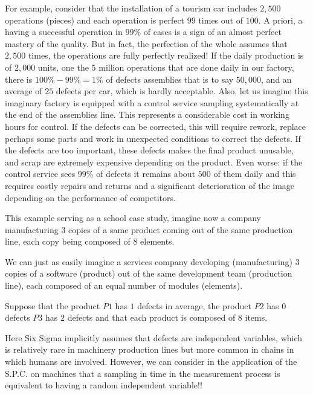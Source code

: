 For example, consider that the installation of a tourism car includes $2,500$ operations (pieces) and each operation is perfect $99$ times out of $100$. A priori, a having a successful operation in $99\%$ of cases is a sign of an almost perfect mastery of the quality. But in fact, the perfection of the whole assumes that $2,500$ times, the operations are fully perfectly realized! If the daily production is of $2,000$ units, one the $5$ million operations that are done daily in our factory, there is $100\%-99\%=1\%$ of defects assemblies that is to say $50,000$, and an average of $25$ defects per car, which is hardly acceptable. Also, let us imagine  this imaginary factory is equipped with a control service sampling systematically at the end of the assemblies line. This represents a considerable cost in working hours for control. If the defects can be corrected, this will require rework, replace perhaps some parts and work in unexpected conditions to correct the defects. If the defects are too important, these defects makes the final product unusable, and scrap are extremely expensive depending on the product. Even worse: if the control service sees $99\%$ of defects it remains about $500$  of them daily and this requires costly repairs and returns and a significant deterioration of the image depending on the performance of competitors.

This example serving as a school case study, imagine now a company manufacturing $3$ copies of a same product coming out of the same production line, each copy being composed of $8$ elements.

	\begin{tcolorbox}[title=Remark,colframe=black,arc=10pt]
We can just as easily imagine a services company developing (manufacturing) 3 copies of a software (product) out of the same development team (production line), each composed of an equal number of modules (elements).
	\end{tcolorbox}

Suppose that the product $P1$ has $1$ defects in average, the product $P2$ has $0$ defects $P3$ has $2$ defects and that each product is composed of 8 items.

Here Six Sigma implicitly assumes that defects are independent variables, which is relatively rare in machinery production lines but more common in chains in which humans are involved. However, we can consider in the application of the S.P.C. on machines that a sampling in time in the measurement process is equivalent to having a random independent variable!!

